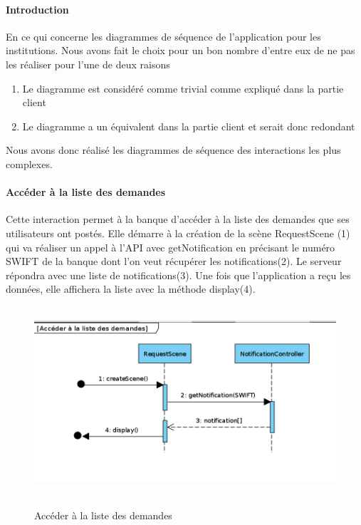 \documentclass{article}
\begin{document}
\paragraph{Introduction}
En ce qui concerne les diagrammes de séquence de l'application pour les institutions.
Nous avons fait le choix pour un bon nombre d'entre eux de ne pas les réaliser pour l'une
de deux raisons
\begin{enumerate}
    \item Le diagramme est considéré comme trivial comme expliqué dans la partie client
    \item Le diagramme a un équivalent dans la partie client et serait donc redondant
\end{enumerate}

Nous avons donc réalisé les diagrammes de séquence des interactions les plus complexes.

\paragraph{Accéder à la liste des demandes}
Cette interaction permet à la banque d'accéder à la liste des demandes que ses utilisateurs
ont postés. Elle démarre à la création de la scène RequestScene (1) qui va réaliser un appel
à l'API avec getNotification en précisant le numéro SWIFT de la banque dont l'on veut récupérer
les notifications(2). Le serveur répondra avec une liste de notifications(3). Une fois que
l'application a reçu les données, elle affichera la liste avec la méthode display(4).

\begin{figure}[h!]
    \hbox{
        \centering\includegraphics[width=\linewidth]{../img/sequence-institution-img1.png}%
    }
    \caption{Accéder à la liste des demandes}
\end{figure}
\end{document}
